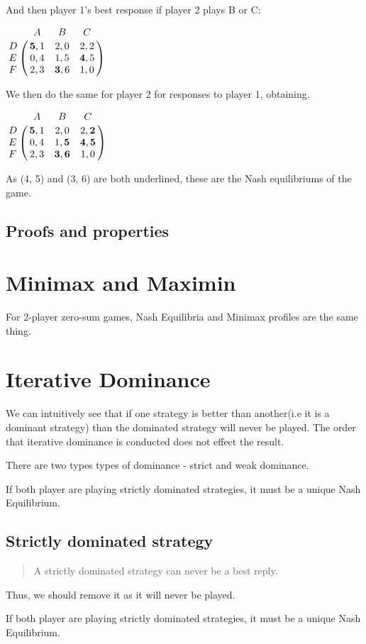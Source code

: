 \documentclass[11pt]{report}
\begin{document}
And then player 1's best response if player 2 plays B or C:
\begin{center}
$ \bordermatrix{~ & A & B & C \cr 
				D & \textbf{5}, 1 & 2, 0 & 2, 2 \cr 
				E & 0, 4 & 1, 5 & \textbf{4}, 5 \cr
				F & 2, 3 & \textbf{3}, 6 & 1, 0 \cr}$  
\end{center}		
We then do the same for player 2 for responses to player 1, obtaining.
\begin{center}
$ \bordermatrix{~ & A & B & C \cr 
				D & \textbf{5}, 1 & 2, 0 & 2, \textbf{2} \cr 
				E & 0, 4 & 1, \textbf{5} & \textbf{4}, \textbf{5} \cr
				F & 2, 3 & \textbf{3}, \textbf{6} & 1, 0 \cr}$  
\end{center}		
As (4, 5) and (3, 6) are both underlined, these are the Nash equilibriums of the game.
			   

\section{Proofs and properties}

\chapter{Minimax and Maximin}
For 2-player zero-sum games, Nash Equilibria and Minimax profiles are the same thing. 


\chapter{Iterative Dominance}
We can intuitively see that if one strategy is better than another(i.e it is a dominant strategy) than the dominated strategy will never be played. The order that iterative dominance is conducted does not effect the result.

There are two types types of dominance - strict and weak dominance.

If both player are playing strictly dominated strategies, it must be a unique Nash Equilibrium. 

\section*{Strictly dominated strategy}
\begin{quote}
A strictly dominated strategy can never be a best reply.
\end{quote}
Thus, we should remove it as it will never be played. 

If both player are playing strictly dominated strategies, it must be a unique Nash Equilibrium. 
\end{document}
